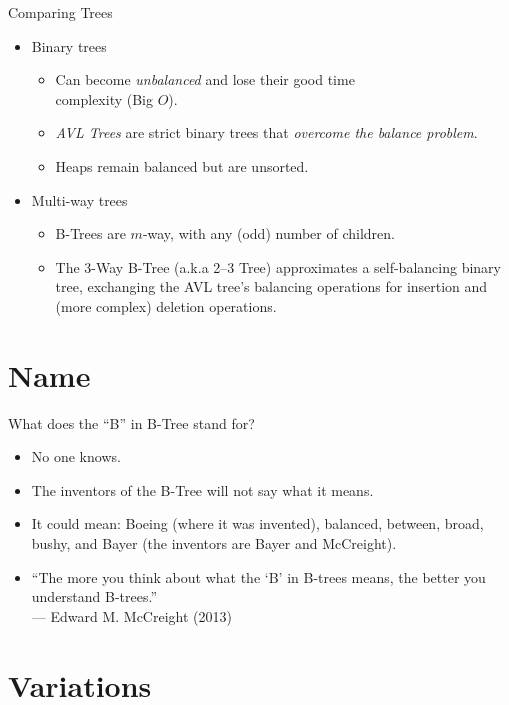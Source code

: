 \documentclass[14pt,aspectratio=1610]{beamer}
\begin{document}
\begin{frame}{Comparing Trees}
\begin{itemize}[<+->]\large
  \item
    Binary trees
    \begin{itemize}
      \item
        Can become \emph{unbalanced} and lose their good time \\complexity (Big \(O\)).
      \item
        \emph{AVL Trees} are strict binary trees that \emph{overcome the balance problem}.
      \item
        Heaps remain balanced but are unsorted.
    \end{itemize}
  \item
    Multi-way trees
    \begin{itemize}
      \item
        B-Trees are \(m\)-way, with any (odd) number of children.
      \item
        The 3-Way B-Tree (a.k.a 2--3 Tree) approximates a self-balancing binary tree, exchanging the AVL tree's balancing operations for insertion and (more complex) deletion operations.
    \end{itemize}
\end{itemize}
\end{frame}

\section*{Name}
\begin{frame}{What does the ``B'' in B-Tree stand for?}
  \pause{}
  \begin{itemize}[<+->]
    \item
      No one knows.
    \item
      The inventors of the B-Tree will not say what it means.
    \item
      It could mean: Boeing (where it was invented), balanced, between, broad, bushy, and Bayer (the inventors are Bayer and McCreight).
    \item
      ``The more you think about what the `B' in B-trees means, the better you understand B-trees.''\\
      \hspace{1em}--- Edward M. McCreight (2013)
  \end{itemize}
  \end{frame}

\section{Variations}
\end{document}
